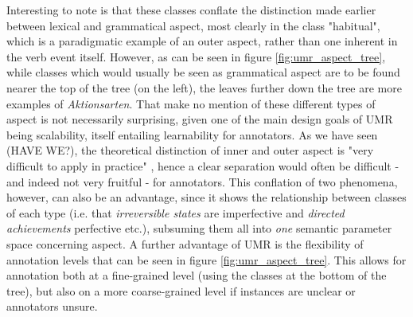 Interesting to note is that these classes conflate the distinction made earlier between lexical and grammatical aspect, most clearly in the class "habitual", which is a paradigmatic example of an outer aspect, rather than one inherent in the verb event itself. However, as can be seen in figure \ref{fig:umr_aspect_tree}, while classes which would usually be seen as grammatical aspect are to be found nearer the top of the tree (on the left), the leaves further down the tree are more examples of \emph{Aktionsarten}. That \citet{umr} make no mention of these different types of aspect is not necessarily surprising, given one of the main design goals of UMR being scalability, itself entailing learnability for annotators. As we have seen (HAVE WE?), the theoretical distinction of inner and outer aspect is "very difficult to apply in practice" \citep{Dahl1985TenseAA}, hence a clear separation would often be difficult - and indeed not very fruitful - for annotators. This conflation of two phenomena, however, can also be an advantage, since it shows the relationship between classes of each type (i.e. that \emph{irreversible states} are imperfective and \emph{directed achievements} perfective etc.), subsuming them all into \emph{one} semantic parameter space concerning aspect. A further advantage of UMR is the flexibility of annotation levels that can be seen in figure \ref{fig:umr_aspect_tree}. This allows for annotation both at a fine-grained level (using the classes at the bottom of the tree), but also on a more coarse-grained level if instances are unclear or annotators unsure.

